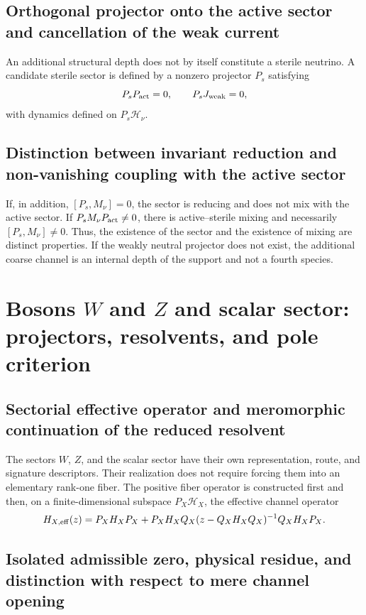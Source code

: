 \subsection{Orthogonal projector onto the active sector and cancellation of the weak current}

An additional structural depth does not by itself constitute a sterile
neutrino. A candidate sterile sector is defined by a nonzero projector
\(P_s\) satisfying
\[
 P_s P_{\rm act}=0,
 \qquad P_s J_{\text{weak}}=0,
\]
with dynamics defined on \(P_s\mathcal H_\nu\).

\subsection{Distinction between invariant reduction and non-vanishing coupling with the active sector}

If, in addition, \([P_s,M_\nu]=0\), the sector is reducing and does not mix with the active sector. If
\(P_sM_\nu P_{\rm act}\ne0\), there is active--sterile mixing and necessarily
\([P_s,M_\nu]\ne0\). Thus, the existence of the sector and the existence of
mixing are distinct properties. If the weakly neutral projector does not exist,
the additional coarse channel is an internal depth of the support and not a fourth
species.

\section{Bosons \texorpdfstring{\(W\) and \(Z\)}{W and Z} and scalar sector: projectors, resolvents, and pole criterion}

\subsection{Sectorial effective operator and meromorphic continuation of the reduced resolvent}

The sectors \(W\), \(Z\), and the scalar sector have their own
representation, route, and signature descriptors. Their realization does not require forcing them into an
elementary rank-one fiber. The positive fiber operator is constructed first
and then, on a finite-dimensional subspace \(P_X\mathcal H_X\), the
effective channel operator
\[
 H_{X,\rm eff}(z)
 =P_X H_X P_X
 +P_X H_X Q_X(z-Q_X H_X Q_X)^{-1}Q_X H_X P_X.
\]
\subsection{Isolated admissible zero, physical residue, and distinction with respect to mere channel opening}

